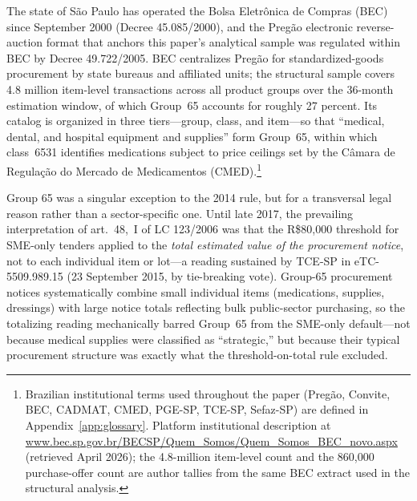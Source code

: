 The state of São Paulo has operated the Bolsa Eletrônica de Compras (BEC) since September 2000 (Decree 45.085/2000), and the Pregão electronic reverse-auction format that anchors this paper's analytical sample was regulated within BEC by Decree 49.722/2005. BEC centralizes Pregão for standardized-goods procurement by state bureaus and affiliated units; the structural sample covers 4.8 million item-level transactions across all product groups over the 36-month estimation window, of which Group~65 accounts for roughly 27 percent. Its catalog is organized in three tiers---group, class, and item---so that ``medical, dental, and hospital equipment and supplies'' form Group~65, within which class~6531 identifies medications subject to price ceilings set by the Câmara de Regulação do Mercado de Medicamentos (CMED).\footnote{Brazilian institutional terms used throughout the paper (Pregão, Convite, BEC, CADMAT, CMED, PGE-SP, TCE-SP, Sefaz-SP) are defined in Appendix~\ref{app:glossary}. Platform institutional description at \url{www.bec.sp.gov.br/BECSP/Quem_Somos/Quem_Somos_BEC_novo.aspx} (retrieved April 2026); the 4.8-million item-level count and the 860{,}000 purchase-offer count are author tallies from the same BEC extract used in the structural analysis.}

Group 65 was a singular exception to the 2014 rule, but for a transversal legal reason rather than a sector-specific one. Until late 2017, the prevailing interpretation of art.~48,~I of LC 123/2006 was that the R\$80{,}000 threshold for SME-only tenders applied to the \emph{total estimated value of the procurement notice}, not to each individual item or lot---a reading sustained by TCE-SP in eTC-5509.989.15 (23 September 2015, by tie-breaking vote). Group-65 procurement notices systematically combine small individual items (medications, supplies, dressings) with large notice totals reflecting bulk public-sector purchasing, so the totalizing reading mechanically barred Group~65 from the SME-only default---not because medical supplies were classified as ``strategic,'' but because their typical procurement structure was exactly what the threshold-on-total rule excluded.


